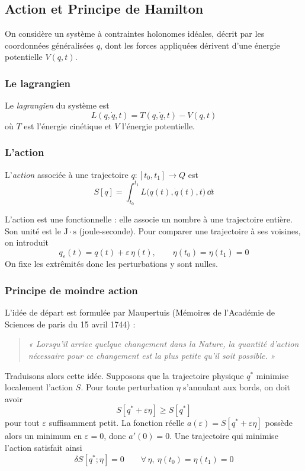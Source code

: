 \subsection{Action et Principe de Hamilton}

On considère un système à contraintes holonomes idéales, décrit par
les coordonnées généralisées $q$, dont les forces appliquées dérivent
d'une énergie potentielle $V(q,t)$.

\subsubsection{Le lagrangien}

\begin{definition}
    Le \emph{lagrangien} du système est
    \[
        L(q,\dot q,t) = T(q,\dot q,t) - V(q,t)
    \]
    où $T$ est l'énergie cinétique et $V$ l'énergie potentielle.
\end{definition}

\subsubsection{L'action}

\begin{definition}[Action]
    L'\emph{action} associée à une trajectoire $q : [t_0,t_1]\to Q$
    est
    \[
        S[q] = \int_{t_0}^{t_1} L\bigl(q(t),\dot q(t),t\bigr)\,\dd t
    \]
\end{definition}

L'action est une fonctionnelle : elle associe un nombre à une
trajectoire entière. Son unité est le $\mathrm{J\cdot s}$ (joule-seconde). Pour comparer une trajectoire à ses voisines, on introduit
\[
    q_\varepsilon(t) = q(t) + \varepsilon\,\eta(t),
    \qquad \eta(t_0) = \eta(t_1) = 0
\]
On fixe les extrêmités donc les perturbations y sont nulles.

\subsubsection{Principe de moindre action}

L'idée de départ est formulée par Maupertuis (Mémoires de l'Académie de Sciences de paris du 15 avril 1744) :
\begin{quote}
    \itshape « Lorsqu'il arrive quelque changement dans la Nature, la
    quantité d'action nécessaire pour ce changement est la plus petite
    qu'il soit possible. »
\end{quote}
Traduisons alors cette idée. Supposons que la trajectoire physique $q^*$
minimise localement l'action $S$. Pour toute perturbation $\eta$
s'annulant aux bords, on doit avoir
\[
    S[q^* + \varepsilon\eta] \geq S[q^*]
\]
pour tout $\varepsilon$ suffisamment petit. La fonction réelle
$a(\varepsilon) = S[q^* + \varepsilon\eta]$ possède alors un minimum
en $\varepsilon = 0$, donc $a'(0) = 0$. Une trajectoire qui minimise
l'action satisfait ainsi
\[
    \delta S[q^*;\eta] = 0
    \qquad \forall\,\eta,\ \eta(t_0) = \eta(t_1) = 0
\]

